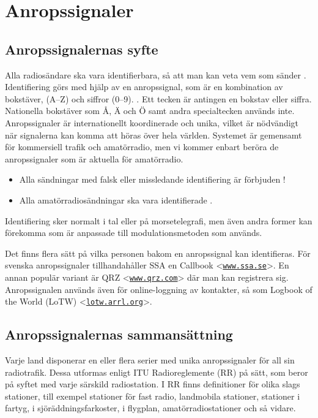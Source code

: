 \section{Anropssignaler}
\label{anropssignaler}

\subsection{Anropssignalernas syfte}

Alla radiosändare ska vara identifierbara, så att man kan veta vem
som sänder \cite[\S19.1]{ITU-RR}.
Identifiering görs med hjälp av en anropssignal, som är en kombination av
bokstäver, (A--Z) och siffror (0--9). \cite[\S19.45]{ITU-RR}.
Ett tecken är antingen en bokstav eller siffra.
Nationella bokstäver som Å, Ä och Ö samt andra specialtecken används inte.
Anropssignaler är internationellt koordinerade och unika, vilket är nödvändigt
när signalerna kan komma att höras över hela världen.
Systemet är gemensamt för kommersiell trafik och amatörradio, men vi kommer
enbart beröra de anropssignaler som är aktuella för amatörradio.

\begin{itemize}
\item Alla sändningar med falsk eller missledande identifiering är förbjuden
\cite[\S19.2]{ITU-RR}!

\item Alla amatörradiosändningar ska vara identifierade \cite[\S19.4, \S19.5]{ITU-RR}.
\end{itemize}

Identifiering sker normalt i tal eller på morsetelegrafi, men även andra former
kan förekomma som är anpassade till modulationsmetoden som används.

Det finns flera sätt på vilka personen bakom en anropssignal kan identifieras.
För svenska anropssignaler tillhandahåller SSA en Callbook
<\href{https://www.ssa.se/}{\texttt{www.ssa.se}}>.
En annan populär variant är QRZ
<\href{https://www.qrz.com/}{\texttt{www.qrz.com}}> där man kan registrera sig.
Anropssignalen används även för online-loggning av kontakter, så som Logbook of
the World (LoTW) <\href{https://lotw.arrl.org/}{\texttt{lotw.arrl.org}}>.

\subsection{Anropssignalernas sammansättning}

Varje land disponerar en eller flera serier med unika anropssignaler för all
sin radiotrafik.
Dessa utformas enligt ITU Radioreglemente (RR) \cite[\S19]{ITU-RR} på sätt,
som beror på syftet med varje särskild radiostation.
I RR finns definitioner för olika slags stationer, till exempel stationer för
fast radio, landmobila stationer, stationer i fartyg, i sjöräddningsfarkoster,
i flygplan, amatörradiostationer och så vidare.

